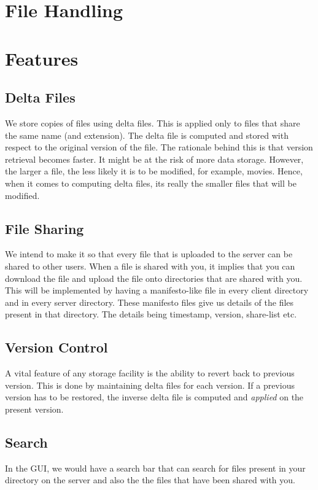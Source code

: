 \documentclass[]{article}
\begin{document}
\subsection{ }

\section{File Handling}

\section{Features}
\subsection{Delta Files}
We store copies of files using delta files. This is applied only to files that share the same name (and extension). The delta file is computed and stored with respect to the original version of the file. The rationale behind this is that version retrieval becomes faster. It might be at the risk of more data storage. However, the larger a file, the less likely it is to be modified, for example, movies. Hence, when it comes to computing delta files, its really the smaller files that will be modified.
\subsection{File Sharing}
We intend to make it so that every file that is uploaded to the server can be shared to other users. When a file is shared with you, it implies that you can download the file and upload the file onto directories that are shared with you. This will be implemented by having a manifesto-like file in every client directory and in every server directory.
These manifesto files give us details of the files present in that directory. The details being timestamp, version, share-list etc.

\subsection{Version Control}
A vital feature of any storage facility is the ability to revert back to previous version. This is done by maintaining delta files for each version. If a previous version has to be restored, the inverse delta file is computed and \textit{applied} on the present version. 

\subsection{Search}
In the GUI, we would have a search bar that can search for files present in your directory on the server and also the the files that have been shared with you.
\end{document}
